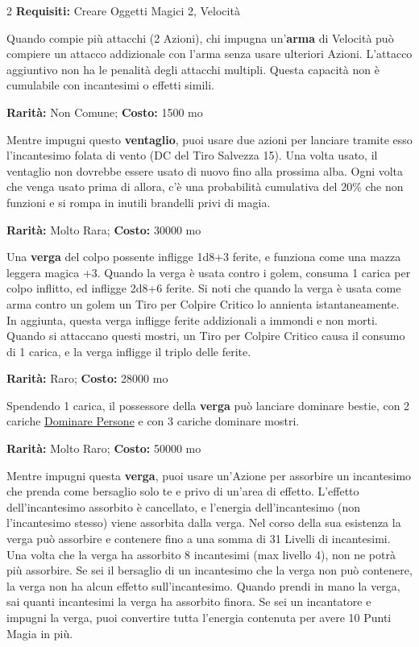 \begin{multicols}{2}
\textbf{Requisiti:} Creare Oggetti Magici 2, Velocità

Quando compie più attacchi (2 Azioni), chi impugna un'\textbf{arma} di Velocità può compiere un attacco addizionale con l'arma senza usare ulteriori Azioni. L'attacco aggiuntivo non ha le penalità degli attacchi multipli. Questa capacità non è cumulabile con incantesimi o effetti simili.


\textbf{Rarità:} Non Comune; \textbf{Costo:} 1500 mo

Mentre impugni questo \textbf{ventaglio}, puoi usare due azioni per lanciare tramite esso l'incantesimo folata di vento (DC del Tiro Salvezza 15). Una volta usato, il ventaglio
non dovrebbe essere usato di nuovo fino alla prossima alba. Ogni volta che venga usato prima di allora, c'è una probabilità cumulativa del 20\% che non funzioni e si rompa in inutili brandelli privi di magia.


\textbf{Rarità:} Molto Rara; \textbf{Costo:} 30000 mo

Una \textbf{verga} del colpo possente infligge 1d8+3 ferite, e funziona come una mazza leggera magica +3. Quando la verga è usata contro i golem, consuma 1 carica per colpo inflitto, ed infligge 2d8+6 ferite. Si noti che quando la verga è usata come arma contro un golem un Tiro per Colpire Critico lo annienta istantaneamente. In aggiunta, questa verga infligge ferite addizionali a immondi e non morti. Quando si attaccano questi mostri, un Tiro per Colpire Critico causa il consumo di 1 carica, e la verga infligge il triplo delle ferite.


\textbf{Rarità:} Raro; \textbf{Costo:} 28000 mo

Spendendo 1 carica, il possessore della \textbf{verga} può lanciare dominare bestie, con 2 cariche \hyperlink{Dominare Persone}{Dominare Persone} e con 3 cariche dominare mostri.


\textbf{Rarità:} Molto Raro; \textbf{Costo:} 50000 mo

Mentre impugni questa \textbf{verga}, puoi usare un'Azione per assorbire un incantesimo che prenda come bersaglio solo te e privo di un'area di effetto. L'effetto dell'incantesimo assorbito è cancellato, e l'energia dell'incantesimo (non l'incantesimo stesso) viene assorbita dalla verga. Nel corso della sua esistenza la verga può assorbire e contenere fino a una somma di 31 Livelli di incantesimi. Una volta che la verga ha assorbito 8 incantesimi (max livello 4), non ne potrà più assorbire. Se sei il bersaglio di un incantesimo che la verga non può contenere, la verga non ha alcun effetto sull'incantesimo. Quando prendi in mano la verga, sai quanti incantesimi la verga ha assorbito finora. Se sei un incantatore e impugni la verga, puoi convertire tutta l'energia contenuta per avere 10 Punti Magia in più.


\end{multicols}
